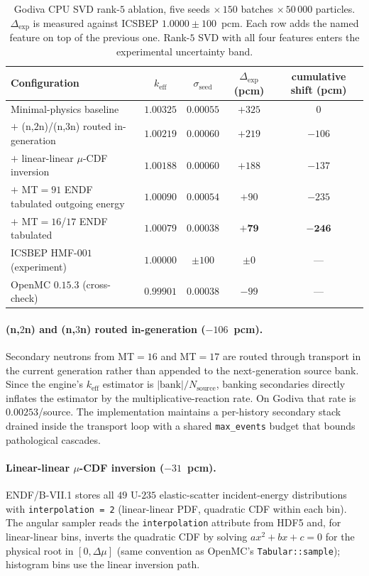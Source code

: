 \begin{table}[t]
\centering
\caption{Godiva CPU SVD rank-$5$ ablation, five seeds
$\times\,150$ batches $\times\,50\,000$ particles.
$\Delta_\text{exp}$ is measured against ICSBEP
$1.0000 \pm 100$~pcm. Each row adds the named feature on
top of the previous one. Rank-$5$ SVD with all four
features enters the experimental uncertainty band.}
\label{tab:keff_godiva_fixes}
\begin{tabular}{@{}lcccc@{}}
\toprule
Configuration & $k_\text{eff}$ & $\sigma_\text{seed}$ &
 $\Delta_\text{exp}$ (pcm) & cumulative shift (pcm) \\
\midrule
Minimal-physics baseline       & $1.00325$ & $0.00055$ & $+325$ &   $0$ \\
$+$ (n,$2$n)/(n,$3$n) routed in-generation  & $1.00219$ & $0.00060$ & $+219$ & $-106$ \\
$+$ linear-linear $\mu$-CDF inversion       & $1.00188$ & $0.00060$ & $+188$ & $-137$ \\
$+$ MT$=91$ ENDF tabulated outgoing energy  & $1.00090$ & $0.00054$ &  $+90$ & $-235$ \\
$+$ MT$=16$/$17$ ENDF tabulated             & $\mathbf{1.00079}$ &
 $\mathbf{0.00038}$ & $\mathbf{+79}$ & $\mathbf{-246}$ \\
\midrule
ICSBEP HMF-$001$ (experiment)  & $1.00000$ & $\pm 100$ & $\pm 0$ & --- \\
OpenMC $0.15.3$ (cross-check)  & $0.99901$ & $0.00038$ &  $-99$ & --- \\
\bottomrule
\end{tabular}
\end{table}

\paragraph{(n,$2$n) and (n,$3$n) routed in-generation
($-106$~pcm).} Secondary neutrons from MT$=16$ and MT$=17$
are routed through transport in the current generation
rather than appended to the next-generation source bank.
Since the engine's $k_\text{eff}$ estimator is
$\lvert\text{bank}\rvert/N_\text{source}$, banking
secondaries directly inflates the estimator by the
multiplicative-reaction rate. On Godiva that rate is
$0.00253$/source. The implementation maintains a
per-history secondary stack drained inside the transport
loop with a shared \texttt{max\_events} budget that bounds
pathological cascades.

\paragraph{Linear-linear $\mu$-CDF inversion ($-31$~pcm).}
ENDF/B-VII.1 stores all $49$ U-$235$ elastic-scatter
incident-energy distributions with \texttt{interpolation =
2} (linear-linear PDF, quadratic CDF within each bin).
The angular sampler reads the \texttt{interpolation}
attribute from HDF5 and, for linear-linear bins, inverts
the quadratic CDF by solving $ax^2 + bx + c = 0$ for the
physical root in $[0, \Delta\mu]$ (same convention as
OpenMC's \texttt{Tabular::sample}); histogram bins use the
linear inversion path.

